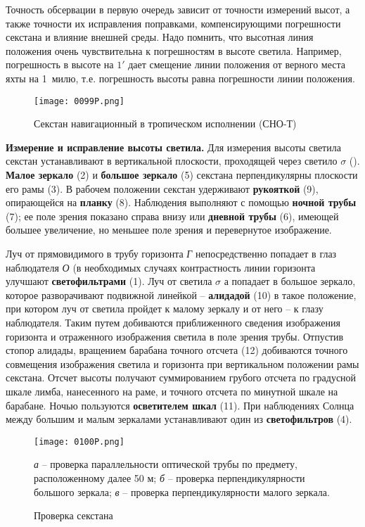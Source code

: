 Точность обсервации в первую очередь зависит от точности измерений
высот, а также точности их исправления поправками, компенсирующими
погрешности секстана и влияние внешней среды. Надо помнить, что
высотная линия положения очень чувствительна к погрешностям в высоте
светила. Например, погрешность в высоте на $1'$ дает смещение линии
положения от верного места яхты на 1~милю, т.е. погрешность высоты
равна погрешности линии положения.

\begin{figure*}[!htb]
  \centering
  \texttt{[image: 0099P.png]}
  \caption{Секстан навигационный в тропическом исполнении (СНО-Т)}
  \label{fig:99}
\end{figure*}

\textbf{Измерение и исправление высоты светила.} Для измерения высоты
светила секстан устанавливают в вертикальной плоскости, проходящей
через светило $\sigma$ (). \textbf{Малое зеркало} (2) и
\textbf{большое зеркало} (5) секстана перпендикулярны плоскости его
рамы (3). В рабочем положении секстан удерживают \textbf{рукояткой}
(9), опирающейся на \textbf{планку} (8). Наблюдения выполняют с
помощью \textbf{ночной трубы} (7); ее поле зрения показано справа
внизу или \textbf{дневной трубы} (6), имеющей большее увеличение, но
меньшее поле зрения и перевернутое изображение.

Луч от прямовидимого в трубу горизонта \textit{Г} непосредственно
попадает в глаз наблюдателя \textit{О} (в необходимых случаях
контрастность линии горизонта улучшают \textbf{светофильтрами}
(1). Луч от светила $\sigma$ а попадает в большое зеркало, которое
разворачивают подвижной линейкой \--- \textbf{алидадой} (10) в такое
положение, при котором луч от светила пройдет к малому зеркалу и от
него \--- к глазу наблюдателя. Таким путем добиваются приближенного
сведения изображения горизонта и отраженного изображения светила в
поле зрения трубы. Отпустив стопор алидады, вращением барабана точного
отсчета (12) добиваются точного совмещения изображения светила и
горизонта при вертикальном положении рамы секстана. Отсчет высоты
получают суммированием грубого отсчета по градусной шкале лимба,
нанесенного на раме, и точного отсчета по минутной шкале на
барабане. Ночью пользуются \textbf{осветителем шкал} (11). При
наблюдениях Солнца между большим и малым зеркалами устанавливают один
из \textbf{светофильтров} (4).

\begin{figure}[!htb]
  \centering
  \texttt{[image: 0100P.png]}
  \caption{Проверка секстана}
  \label{fig:100}
  \small
  \textit{а} \--- проверка параллельности оптической трубы по предмету, расположенному далее 50 м;
  \textit{б} \--- проверка перпендикулярности большого зеркала;
  \textit{в} \--- проверка перпендикулярности малого зеркала.

\end{figure}

